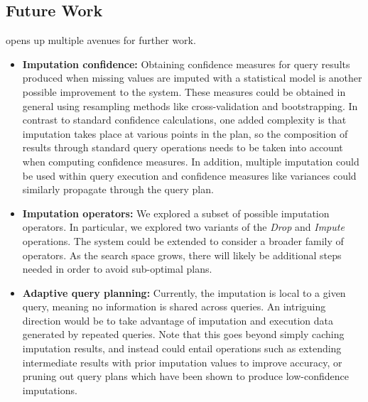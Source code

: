 \pagebreak
\subsection{Future Work}
\ProjectName{} opens up multiple avenues for further work.

\begin{itemize}
\item \textbf{Imputation confidence:} Obtaining confidence measures for query results
produced when missing values are imputed with a statistical model is
another possible improvement to the system. These measures could be obtained in general
using resampling methods like cross-validation and bootstrapping\cite{kohavi1995study}.
In contrast to standard confidence calculations, one added complexity is that
imputation takes place at various points in the plan, so the composition of results
through standard query operations needs to be taken into account when computing confidence
measures.
In addition, multiple imputation could be used within query execution and confidence measures like variances could
similarly propagate through the query plan.

\item \textbf{Imputation operators:} We explored a subset of possible imputation operators.
In particular, we explored two variants of the \textit{Drop} and \textit{Impute} operations. The system
could be extended to consider a broader family of operators. As the search space grows,
there will likely be additional steps needed in order to avoid sub-optimal plans.

\item \textbf{Adaptive query planning:} Currently, the imputation is local to a given query, meaning
no information is shared across queries. An intriguing direction would be to take advantage
of imputation and execution data generated by repeated queries. Note that this goes beyond
simply caching imputation results, and instead could entail operations such as extending
intermediate results with prior imputation values to improve accuracy, or pruning out
query plans which have been shown to produce low-confidence imputations.
\end{itemize}

